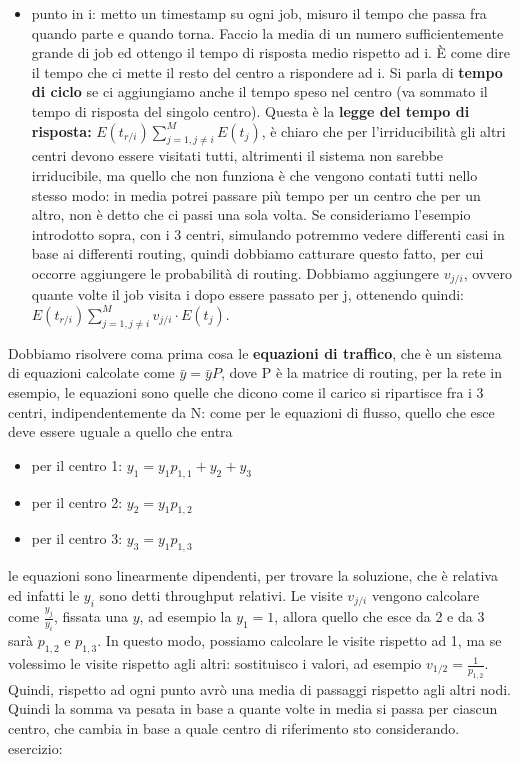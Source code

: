 \documentclass{article}
\begin{document}
\begin{itemize}
\item punto in i: metto un timestamp su ogni job, misuro il tempo che passa fra quando parte e quando torna. Faccio la media di un numero sufficientemente grande di job ed ottengo il tempo di risposta medio rispetto ad i. È come dire il tempo che ci mette il resto del centro a rispondere ad i. Si parla di \textbf{tempo di ciclo} se ci aggiungiamo anche il tempo speso nel centro (va sommato il tempo di risposta del singolo centro). Questa è la \textbf{legge del tempo di risposta: }$E(t_{r/i}) \sum\limits_{j=1, j\neq i}^{M} E(t_j)$, è chiaro che per l'irriducibilità gli altri centri devono essere visitati tutti, altrimenti il sistema non sarebbe irriducibile, ma quello che non funziona è che vengono contati tutti nello stesso modo: in media potrei passare più tempo per un centro che per un altro, non è detto che ci passi una sola volta. Se consideriamo l'esempio introdotto sopra, con i 3 centri, simulando potremmo vedere differenti casi in base ai differenti routing, quindi dobbiamo catturare questo fatto, per cui occorre aggiungere le probabilità di routing. Dobbiamo aggiungere $v_{j/i}$, ovvero quante volte il job visita i dopo essere passato per j, ottenendo quindi: $E(t_{r/i}) \sum\limits_{j=1, j\neq i}^{M} v_{j/i} \cdot E(t_j)$.
\end{itemize}
Dobbiamo risolvere coma prima cosa le \textbf{equazioni di traffico}, che è un sistema di equazioni calcolate come $\bar{y} = \bar{y}P$, dove P è la matrice di routing, per la rete in esempio, le equazioni sono quelle che dicono come il carico si ripartisce fra i 3 centri, indipendentemente da N: come per le equazioni di flusso, quello che esce deve essere uguale a quello che entra
\begin{itemize}
\item per il centro 1: $y_1 = y_1 p_{1,1} + y_2 + y_3$
\item per il centro 2: $y_2 = y_1 p_{1,2}$
\item per il centro 3: $y_3 = y_1 p_{1,3}$
\end{itemize}
le equazioni sono linearmente dipendenti, per trovare la soluzione, che è relativa ed infatti le $y_i$ sono detti throughput relativi. Le visite $v_{j/i}$ vengono calcolare come $\frac{y_j}{y_i}$, fissata una $y$, ad esempio la $y_1 = 1$, allora quello che esce da 2 e da 3 sarà $p_{1,2}$ e $p_{1,3}$. In questo modo, possiamo calcolare le visite rispetto ad 1, ma se volessimo le visite rispetto agli altri: sostituisco i valori, ad esempio $v_{1/2} = \frac{1}{p_{1,2}}$. Quindi, rispetto ad ogni punto avrò una media di passaggi rispetto agli altri nodi. Quindi la somma va pesata in base a quante volte in media si passa per ciascun centro, che cambia in base a quale centro di riferimento sto considerando.\\ esercizio:\\\\
\end{document}
